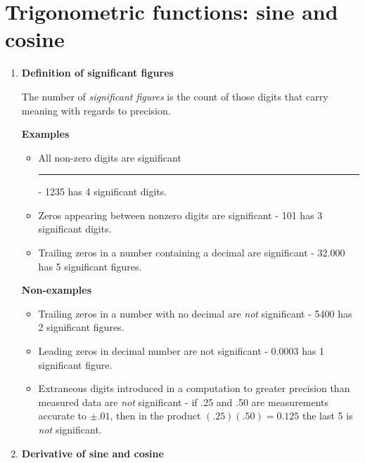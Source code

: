 \section{Trigonometric functions: sine and cosine}
\begin{enumerate}
    \item \textbf{Definition of significant figures}
        
        The number of \textit{significant figures} is the count of those digits that carry meaning with regards to precision.
        
        \textbf{Examples}
        \begin{itemize}
            \item All non-zero digits are significant \rule{20pt}{1pt} - 1235 has 4 significant digits.
            \item Zeros appearing between nonzero digits are significant - 101 has 3 significant digits.
            \item Trailing zeros in a number containing a decimal are significant - 32.000 has 5 significant figures.
        \end{itemize}
        \textbf{Non-examples}
        \begin{itemize}
            \item Trailing zeros in a number with no decimal are \textit{not} significant - 5400 has 2 significant figures.
            \item Leading zeros in decimal number are not significant - 0.0003 has 1 significant figure.
            \item Extraneous digits introduced in a computation to greater precision than measured data are \textit{not} significant - if .25 and .50 are measurements accurate to $\pm.01$, then in the product $(.25)(.50)=0.125$ the last 5 is \textit{not} significant.
        \end{itemize}
    \item \textbf{Derivative of sine and cosine}
        

\end{enumerate}
